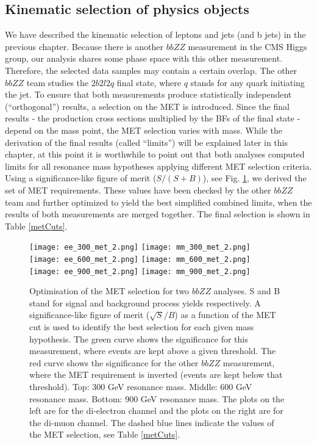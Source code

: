 \subsection{Kinematic selection of physics objects}
We have described the kinematic selection of leptons and jets (and b jets) in the previous chapter. Because there is another $bbZZ$ measurement in the CMS Higgs group, our analysis shares some phase space with this other measurement. Therefore, the selected data samples may contain a certain overlap. The other $bbZZ$ team studies the $2 b 2 l 2 q$ final state, where $q$ stands for any quark initiating the jet. To ensure that both measurements produce statistically independent (``orthogonal'') results, a selection on the MET is introduced. Since the final results - the production cross sections multiplied by the BFs of the final state - depend on the mass point, the MET selection varies with mass. While the derivation of the final results (called ``limits'') will be explained later in this chapter, at this point it is worthwhile to point out that both analyses computed limits for all resonance mass hypotheses applying different MET selection criteria. Using a significance-like figure of merit ($S/(S+B)$), see Fig. \ref{fig:met_cuts}, we derived the set of MET requirements. These values have been checked by the other $bbZZ$ team and further optimized to yield the best simplified combined limits, when the results of both measurements are merged together. The final selection is shown in Table \ref{metCuts}.  %

\begin{figure}[H]%
\begin{center}
\texttt{[image: ee\_300\_met\_2.png]}
\texttt{[image: mm\_300\_met\_2.png]}\\
\texttt{[image: ee\_600\_met\_2.png]}
\texttt{[image: mm\_600\_met\_2.png]}\\
\texttt{[image: ee\_900\_met\_2.png]}
\texttt{[image: mm\_900\_met\_2.png]}\\
\caption[Optimisation of the MET selection for two $bbZZ$ analyses]{ Optimisation of the MET selection for two $bbZZ$ analyses. S and B stand for signal and background process yields respectively. A significance-like figure of merit ($\sqrt{S}/B$) as a function of the MET cut is used to identify the best selection for each given mass hypothesis. The green curve shows the significance for this measurement, where events are kept above a given threshold. The red curve shows the  significance for the other $bbZZ$ measurement, where the MET requirement is inverted (events are kept below that threshold). Top: 300 GeV resonance mass. Middle: 600 GeV resonance mass. Bottom: 900 GeV resonance mass. The plots on the left are for the di-electron channel and the plots on the right are for the di-muon channel. The dashed blue lines indicate the values of the MET selection, see Table \ref{metCuts}.}
\label{fig:met_cuts}
\end{center}
\end{figure}

